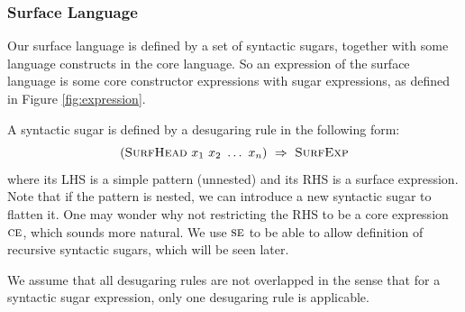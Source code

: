 
\subsubsection{Surface Language}

Our surface language is defined by a set of syntactic sugars, together with some language constructs in the core language. So an expression of the surface language is some core constructor expressions with sugar expressions, as defined in Figure \ref{fig:expression}.

A syntactic sugar is defined by a desugaring rule in the following form:
\[
(\mbox{\sc SurfHead}~x_1~x_2~\ldots~x_n) ~\Rightarrow~ \mbox{\sc SurfExp}
\]
where its LHS is a simple pattern (unnested) and its RHS is a surface expression. Note that if the pattern is nested, we can introduce a new syntactic sugar to flatten it.
One may wonder why not restricting the RHS to be a core expression $\mbox{\sc ce}$, which sounds more natural. We use $\mbox{\sc se}$ to be able to allow definition of recursive syntactic sugars, which will be seen later.

We assume that all desugaring rules are not overlapped in the sense that for a syntactic sugar expression, only one desugaring rule is applicable.

